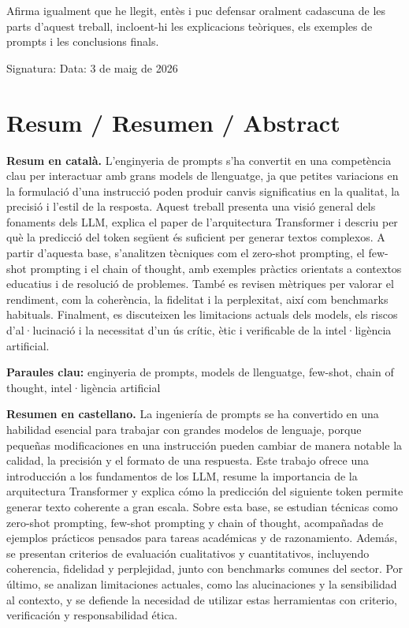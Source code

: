 \documentclass[12pt,a4paper]{report}
\begin{document}
Afirma igualment que he llegit, entès i puc defensar oralment cadascuna de les parts d'aquest treball, incloent-hi les explicacions teòriques, els exemples de prompts i les conclusions finals.

Signatura: \underline{\hspace{6cm}} \quad Data: 3 de maig de 2026

\clearpage
\section*{Resum / Resumen / Abstract}
\thispagestyle{empty}
\textbf{Resum en català.} L'enginyeria de prompts s'ha convertit en una competència clau per interactuar amb grans models de llenguatge, ja que petites variacions en la formulació d'una instrucció poden produir canvis significatius en la qualitat, la precisió i l'estil de la resposta. Aquest treball presenta una visió general dels fonaments dels LLM, explica el paper de l'arquitectura Transformer i descriu per què la predicció del token següent és suficient per generar textos complexos. A partir d'aquesta base, s'analitzen tècniques com el zero-shot prompting, el few-shot prompting i el chain of thought, amb exemples pràctics orientats a contextos educatius i de resolució de problemes. També es revisen mètriques per valorar el rendiment, com la coherència, la fidelitat i la perplexitat, així com benchmarks habituals. Finalment, es discuteixen les limitacions actuals dels models, els riscos d'al·lucinació i la necessitat d'un ús crític, ètic i verificable de la intel·ligència artificial.

\textbf{Paraules clau:} enginyeria de prompts, models de llenguatge, few-shot, chain of thought, intel·ligència artificial

\vspace{1em}
\textbf{Resumen en castellano.} La ingeniería de prompts se ha convertido en una habilidad esencial para trabajar con grandes modelos de lenguaje, porque pequeñas modificaciones en una instrucción pueden cambiar de manera notable la calidad, la precisión y el formato de una respuesta. Este trabajo ofrece una introducción a los fundamentos de los LLM, resume la importancia de la arquitectura Transformer y explica cómo la predicción del siguiente token permite generar texto coherente a gran escala. Sobre esta base, se estudian técnicas como zero-shot prompting, few-shot prompting y chain of thought, acompañadas de ejemplos prácticos pensados para tareas académicas y de razonamiento. Además, se presentan criterios de evaluación cualitativos y cuantitativos, incluyendo coherencia, fidelidad y perplejidad, junto con benchmarks comunes del sector. Por último, se analizan limitaciones actuales, como las alucinaciones y la sensibilidad al contexto, y se defiende la necesidad de utilizar estas herramientas con criterio, verificación y responsabilidad ética.
\end{document}

